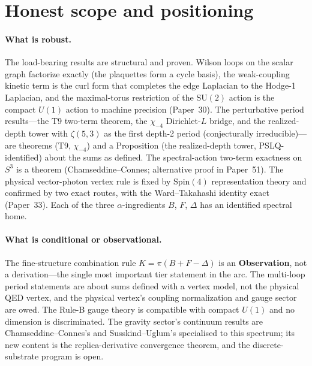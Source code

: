 \documentclass[aps,pra,twocolumn,superscriptaddress,longbibliography]{revtex4-2}
\newcommand{\gvc}[2]{#2}
\begin{document}
\section{Honest scope and positioning}

\paragraph{What is robust.}
The load-bearing results are structural and proven.  Wilson loops on the
scalar graph factorize exactly (the plaquettes form a cycle basis), the
weak-coupling kinetic term is the curl form that completes the edge
Laplacian to the Hodge-1 Laplacian, and the maximal-torus restriction of
the $\mathrm{SU}(2)$ action is the compact $U(1)$ action to machine
precision (Paper~30).  The perturbative period results---the T9
two-term theorem, the $\chi_{-4}$ Dirichlet-$L$ bridge, and the
realized-depth tower with $\zeta(5,3)$ as the first depth-2 period
(conjecturally irreducible)---are theorems (T9, $\chi_{-4}$) and a
Proposition (the realized-depth tower, PSLQ-identified) about the sums as
defined.  The spectral-action two-term exactness on $S^3$ is a theorem
(Chamseddine--Connes; alternative proof in Paper~51).  The physical
vector-photon vertex rule is fixed by $\mathrm{Spin}(4)$ representation
theory and confirmed by two exact routes, with the Ward--Takahashi
identity exact (Paper~33).  Each of the three
$\alpha$-ingredients $B$, $F$, $\Delta$ has an identified spectral home.

\paragraph{What is conditional or observational.}
\gvc{k-combination-rule}{The fine-structure combination rule $K=\pi(B+F-\Delta)$ is an
\textbf{Observation}, not a derivation}---the single most important tier
statement in the arc.  The multi-loop period statements are about sums
defined with a vertex model, not the physical QED vertex, and the
physical vertex's coupling normalization and gauge sector are owed.  The Rule-B gauge theory is compatible with compact $U(1)$
and no dimension is discriminated.  The gravity sector's continuum results
are Chamseddine--Connes's and Susskind--Uglum's specialised to this
spectrum; its new content is the replica-derivative convergence theorem,
and the discrete-substrate program is open.
\end{document}
